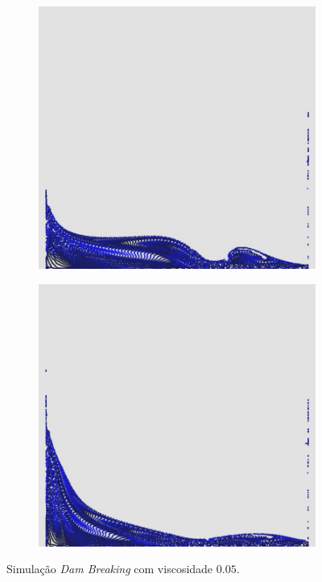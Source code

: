 \documentclass[12pt,a4paper,dvipsnames]{article}
\begin{document}
\begin{figure}[!ht]
\begin{subfigure}[!h]{0.3\textwidth}
	\end{subfigure}
	\begin{subfigure}[!h]{0.3\textwidth} \centering
		\includegraphics[width=\textwidth]{VDB/VDB-11.jpg}
	\end{subfigure}
	\begin{subfigure}[!h]{0.3\textwidth} \centering
		\includegraphics[width=\textwidth]{VDB/VDB-12.jpg}
	\end{subfigure}
    \caption{Simulação \textit{Dam Breaking} com viscosidade $0.05$.}
    \label{fig:viscdambreaking}
\end{figure}
\end{document}
